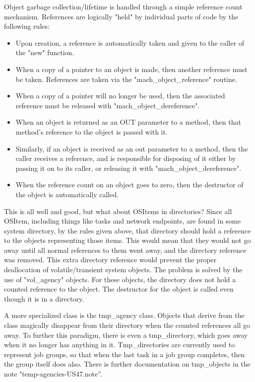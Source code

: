 Object garbage collection/lifetime is handled through a simple reference
count mechanism.  References are logically "held" by individual parts
of code by the following rules:
\begin{itemize}
\item Upon creation, a reference is automatically taken and given to
the caller of the "new" function.

\item When a copy of a pointer to an object is made, then another reference
must be taken.  References are taken via the "mach\_object\_reference" routine.

\item When a copy of a pointer will no longer be used, then the associated
reference must be released with "mach\_object\_dereference".

\item When an object is returned as an OUT parameter to a method, then
that method's reference to the object is passed with it.

\item Similarly, if an object is received as an out parameter to a method,
then the caller receives a reference, and is responsible
for disposing of it either by passing it on to its caller, or releasing
it with "mach\_object\_dereference".

\item When the reference count on an object goes to zero, then the destructor
of the object is automatically called.
\end{itemize}

This is all well and good, but what about OSItems in directories?  Since
all OSItem, including things like tasks and network endpoints, are found
in some system directory,  by the rules given above, that directory
should hold a reference to the objects representing those items.  This would
mean that they would not go away until all normal references to them went
away, and the directory reference was removed.  This extra directory
reference would prevent the proper deallocation of volatile/transient
system
objects.  The problem is solved by the use of "vol\_agency" objects.  For
these objects, the directory does not hold a counted reference to the object.
The destructor for the object is called even though it is in a directory.

A more specialized class is the tmp\_agency class.  Objects that derive
from the class magically disappear from their directory when the counted
references all go away.  To further this paradigm, there is even a
tmp\_directory, which goes away when it no longer has anything in it.
Tmp\_directories are currently used to represent job groups, so that when the
last task in a job group completes, then the group itself does also.
There is further documentation on tmp\_objects in the note "temp-agencies-US47.note''.

